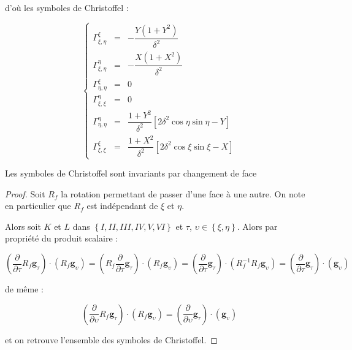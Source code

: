 d'où les symboles de Christoffel :

\begin{equation}
\left\lbrace
\begin{array}{rcl}
\Gamma_{\xi,\eta}^{\xi} & = & - \dfrac{Y ( 1+Y^2)}{\delta^2}\\
\Gamma_{\xi,\eta}^{\eta} & = & - \dfrac{X(1+X^2)}{\delta^2}\\
\Gamma_{\eta,\eta}^{\xi} & = & 0 \\
\Gamma_{\xi,\xi}^{\eta} & = & 0 \\
\Gamma_{\eta,\eta}^{\eta} & = & \dfrac{1+Y^2}{\delta^2} \left[ 2 \delta^2 \cos \eta \sin \eta - Y \right]\\
\Gamma_{\xi,\xi}^{\xi} & = & \dfrac{1+X^2}{\delta^2} \left[ 2 \delta^2 \cos \xi \sin \xi - X \right]
\end{array}
\right.
\end{equation}

\begin{proposition}
Les symboles de Christoffel sont invariants par changement de face
\end{proposition}

\begin{proof}
Soit $R_f$ la rotation permettant de passer d'une face à une autre. On note en particulier que $R_f$ est indépendant de $\xi$ et $\eta$.

Alors soit $K$ et $L$ dans $\left\lbrace I, II, III, IV, V, VI \right\rbrace$ et $\tau$, $\upsilon \in \left\lbrace \xi, \eta \right\rbrace$. Alors par propriété du produit scalaire :

$$\left( \dfrac{\partial}{\partial \tau}  R_f \mathbf{g}_{\tau} \right) \cdot \left( R_f \mathbf{g}_{\upsilon} \right) = \left( R_f \dfrac{\partial}{\partial \tau}   \mathbf{g}_{\tau} \right) \cdot \left( R_f \mathbf{g}_{\upsilon} \right) =  \left( \dfrac{\partial}{\partial \tau}  \mathbf{g}_{\tau} \right) \cdot \left( R_f^{-1} R_f \mathbf{g}_{\upsilon} \right) =  \left( \dfrac{\partial}{\partial \tau}  \mathbf{g}_{\tau} \right) \cdot \left( \mathbf{g}_{\upsilon} \right)$$

de même :

$$\left( \dfrac{\partial}{\partial \upsilon}  R_f \mathbf{g}_{\tau} \right) \cdot \left( R_f \mathbf{g}_{\upsilon} \right) =  \left( \dfrac{\partial}{\partial \upsilon} \mathbf{g}_{\tau} \right) \cdot \left( \mathbf{g}_{\upsilon} \right)$$

et on retrouve l'ensemble des symboles de Christoffel.
\end{proof}































